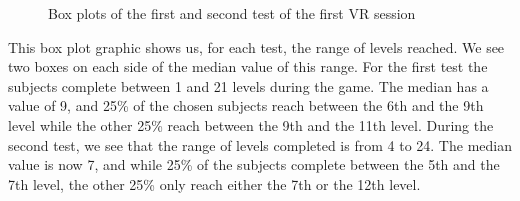 \documentclass[12pt, openany, twocolumn]{article}
\begin{document}
                \begin{figure}[H]
                    \setlength{\fboxsep}{0pt}
                    \setlength{\fboxrule}{1pt}
                    \caption{Box plots of the first and second test of the first VR session}
                \end{figure}

            This box plot graphic shows us, for each test, the range of levels reached.
            We see two boxes on each side of the median value of this range.
            For the first test the subjects complete between 1 and 21 levels during the game. 
            The median has a value of 9, and 25\% of the chosen subjects reach between the 6th and the 9th level while the other 25\% reach between the 9th and the 11th level.
            During the second test, we see that the range of levels completed is from 4 to 24.
            The median value is now 7, and while 25\% of the subjects complete between the 5th and the 7th level, the other 25\% only reach either the 7th or the 12th level.
            \\
\end{document}
